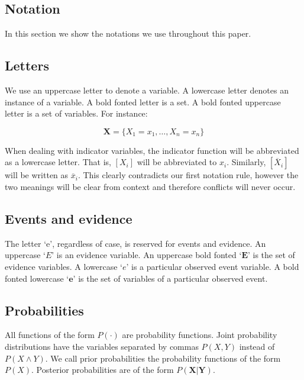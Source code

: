 \documentclass[a4paper,10pt]{article}
\theoremstyle{plain}
\begin{document}
\newpage
\begin{appendices}
\section{Notation}\label{app:not}

In this section we show the notations we use throughout this paper.

\subsection{Letters}

We use an uppercase letter to denote a variable. A lowercase letter denotes an instance of a
variable. A bold fonted letter is a set. A bold fonted uppercase letter is a set of variables. For
instance:

\begin{equation*}
  \mathbf{X}=\{X_1=x_1,\ldots,X_n=x_n\}
\end{equation*}

When dealing with indicator variables, the indicator function will be abbreviated as a lowercase
letter. That is, $[X_i]$ will be abbreviated to $x_i$. Similarly, $[\overline{X}_i]$ will be
written as $\overline{x}_i$. This clearly contradicts our first notation rule, however the two
meanings will be clear from context and therefore conflicts will never occur.

\subsection{Events and evidence}

The letter `e', regardless of case, is reserved for events and evidence. An uppercase `$E$' is an
evidence variable. An uppercase bold fonted `$\mathbf{E}$' is the set of evidence variables. A
lowercase `$e$' is a particular observed event variable. A bold fonted lowercase `$\mathbf{e}$' is
the set of variables of a particular observed event.

\subsection{Probabilities}

All functions of the form $P(\cdot)$ are probability functions. Joint probability distributions
have the variables separated by commas $P(X,Y)$ instead of $P(X \wedge Y)$. We call prior
probabilities the probability functions of the form $P(X)$. Posterior probabilities are of the form
$P(\mathbf{X}|\mathbf{Y})$.


\end{appendices}
\end{document}
